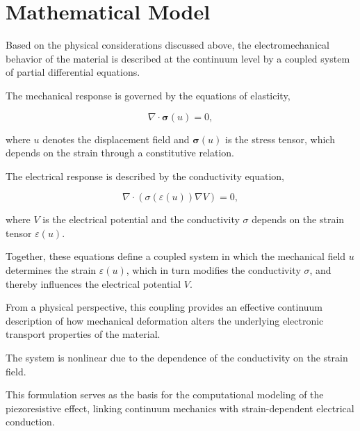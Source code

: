 \section{Mathematical Model}

Based on the physical considerations discussed above, the electromechanical behavior 
of the material is described at the continuum level by a coupled system of partial differential equations.

The mechanical response is governed by the equations of elasticity,

\begin{equation}
    \nabla \cdot \boldsymbol{\sigma}(u) = 0,
\end{equation}

where $u$ denotes the displacement field and $\boldsymbol{\sigma}(u)$ is the stress tensor, 
which depends on the strain through a constitutive relation.

The electrical response is described by the conductivity equation,

\begin{equation}
    \nabla \cdot \left( \sigma(\varepsilon(u)) \nabla V \right) = 0,
\end{equation}

where $V$ is the electrical potential and the conductivity $\sigma$ depends on the strain tensor 
$\varepsilon(u)$.

Together, these equations define a coupled system in which the mechanical field $u$ determines 
the strain $\varepsilon(u)$, which in turn modifies the conductivity $\sigma$, and thereby 
influences the electrical potential $V$.

From a physical perspective, this coupling provides an effective continuum description of how 
mechanical deformation alters the underlying electronic transport properties of the material.

The system is nonlinear due to the dependence of the conductivity on the strain field.

This formulation serves as the basis for the computational modeling of the piezoresistive effect, 
linking continuum mechanics with strain-dependent electrical conduction.
